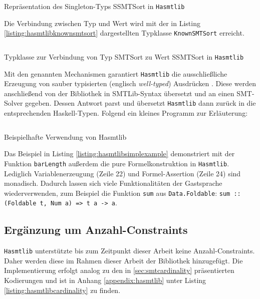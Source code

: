 \begin{listing}[H]
    \inputminted[linenos=true]{haskell}{Code/Implementierung/Hasmtlib/SSMTSort.hs}
    \caption{Repräsentation des Singleton-Typs SSMTSort in \texttt{Hasmtlib} \cite{hasmtlibSSMTSort}}
    \label{listing:hasmtlibssmtsort}
\end{listing}

Die Verbindung zwischen Typ und Wert wird mit der in Listing \ref{listing:hasmtlibknownsmtsort} dargestellten Typklasse \texttt{KnownSMTSort} erreicht.

\begin{listing}[H]
    \inputminted[linenos=true]{haskell}{Code/Implementierung/Hasmtlib/KnownSMTSort.hs}
    \caption{Typklasse zur Verbindung von Typ SMTSort zu Wert SSMTSort in \texttt{Hasmtlib} \cite{hasmtlibSSMTSort}}
    \label{listing:hasmtlibknownsmtsort}
\end{listing}

Mit den genannten Mechanismen garantiert \texttt{Hasmtlib} die ausschließliche Erzeugung von sauber typisierten (englisch \textit{well-typed}) Ausdrücken \cite{gadts}.
Diese werden anschließend von der Bibliothek in SMTLib-Syntax übersetzt und an einen SMT-Solver gegeben.
Dessen Antwort parst und übersetzt \texttt{Hasmtlib} dann zurück in die entsprechenden Haskell-Typen.
Folgend ein kleines Programm zur Erläuterung:

\begin{listing}[H]
    \inputminted[linenos=true]{haskell}{Code/Implementierung/Hasmtlib/BeispielSimple.hs}
    \caption{Beispielhafte Verwendung von Hasmtlib}
    \label{listing:hasmtlibsimplexample}
\end{listing}

Das Beispiel in Listing \ref{listing:hasmtlibsimplexample} demonstriert mit der Funktion \texttt{barLength} außerdem die pure Formelkonstruktion in \texttt{Hasmtlib}.
Lediglich Variablenerzeugung (Zeile 22) und Formel-Assertion (Zeile 24) sind monadisch.
Dadurch lassen sich viele Funktionalitäten der Gastsprache wiederverwenden, zum Beispiel die Funktion \texttt{sum} aus \texttt{Data.Foldable}:
\texttt{sum :: (Foldable t, Num a) => t a -> a}.

\subsection{Ergänzung um Anzahl-Constraints}
\label{subsec:implCardinality}
\texttt{Hasmtlib} unterstützte bis zum Zeitpunkt dieser Arbeit keine Anzahl-Constraints.
Daher werden diese im Rahmen dieser Arbeit der Bibliothek hinzugefügt.
Die Implementierung erfolgt analog zu den in \ref{sec:smtcardinality} präsentierten Kodierungen und ist in
Anhang \ref{appendix:hasmtlib} unter Listing \ref{listing:hasmtlibcardinality} zu finden.

